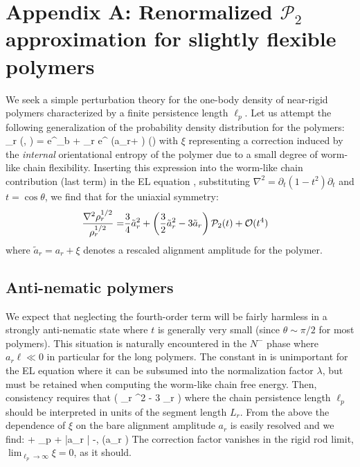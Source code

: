\section*{Appendix A: Renormalized ${\mathcal P}_{2}$ approximation for slightly flexible polymers}

We seek a simple perturbation theory for the one-body density     of near-rigid polymers characterized by a finite persistence length $\ell_{p}$. Let us attempt the following generalization of the probability density distribution for the polymers: 
\beq
 \rho_{r} (\ell , \oma) =  \ell e^{\varepsilon_{b} + \lambda_{r} \ell} e^{ \ell (a_{r}+ \xi) \pp(\oma) }
\eeq
with $\xi$ representing a correction induced by the {\em internal} orientational entropy of the polymer due to a small degree of worm-like chain flexibility. 
Inserting this expression into the worm-like chain contribution (last term) in the EL equation  ,  substituting $\nabla^{2} = \partial_{t} (1-t^{2}) \partial_{t}$ and $t= \cos \theta$,  we find that for the uniaxial symmetry:
\begin{align}
\frac{\nabla^{2}  \rho_{r}^{1/2}}{  \rho_{r} ^{1/2} }  = & \frac{3}{4} \tilde{a}_{r}^{2} + \left  ( \frac{3}{2}  \tilde{a}_{r} ^{2}  - 3 \tilde{a}_{r} \right ) {\mathcal P}_{2}(t) + {\mathcal O}(t^{4})
\label{roro1}
\end{align}
where $\tilde{a}_{r} = a_{r}  + \xi$ denotes a rescaled alignment amplitude for the polymer. 

\subsection*{Anti-nematic polymers}
We expect that neglecting the fourth-order term will be fairly harmless in a strongly anti-nematic state  where $t $ is generally very small (since $\theta \sim \pi/2 $ for most polymers). This situation is naturally encountered in the  $N^{-}$ phase where $a_{r} \ell \ll 0 $ in particular for the long polymers.  The constant  in  is unimportant for the EL equation where it can be subsumed into the normalization factor $\lambda$, but must be retained when computing the worm-like chain free energy. Then, consistency requires that
\beq
\xi \approx  {}  \left  (   _{r} ^{2}  - 3 _{r}  \right )
\eeq 
where the chain persistence length $\ell_{p}$ should be interpreted in units of the segment length $L_{r}$.  From the above the dependence of $\xi$ on the bare alignment amplitude $a_{r}$ is easily resolved and we find:
 \beq
 \xi {}+ \ell_{p} +   |a_{r} |  -, \hspace{0.3cm} (a_{r}  )
 \label{xi1}
 \eeq 
The correction factor vanishes in the rigid rod limit, $\lim_{\ell_{p} \rightarrow \infty} \xi = 0$, as it should.

